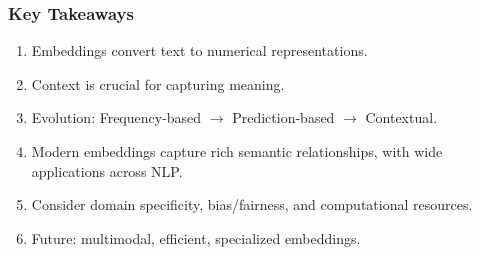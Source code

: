 \begin{frame}[fragile]\frametitle{Key Takeaways}
\begin{enumerate}
\item Embeddings convert text to numerical representations.
\item Context is crucial for capturing meaning.
\item Evolution: Frequency-based $\rightarrow$ Prediction-based $\rightarrow$ Contextual.
\item Modern embeddings capture rich semantic relationships, with wide applications across NLP.
\item Consider domain specificity, bias/fairness, and computational resources.
\item Future: multimodal, efficient, specialized embeddings.
\end{enumerate}
\end{frame}
